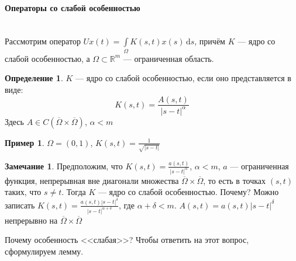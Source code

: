 \documentclass[11pt,openany,a4paper]{scrartcl}
\theoremstyle{plain}
\theoremstyle{definition}
\newtheorem{definition}[theorem]{Определение}
\newtheorem{remark}[theorem]{Замечание}
\newtheorem{example}[theorem]{Пример}
\newcommand\mb{\mathbb}
\newcommand\real{\mb R}
\newcommand\lparagraph[1]{\paragraph{#1}\mbox{}\\}
\newcommand{\dif}{\, \mathrm d}
\begin{document}
\lparagraph{Операторы со слабой особенностью}

Рассмотрим оператор $Ux(t) = \int\limits_\Omega K(s, t) x(s) \dif s$, причём $K$ —
ядро со слабой особенностью, а $\Omega \subset \real^m$ — ограниченная область.

\begin{definition}
    $K$ — ядро со слабой особенностью, если оно представляется в виде:
    $$
    K(s, t) = \frac{A(s, t)}{|s - t|^\alpha}
    $$
    Здесь $A \in C(\overline\Omega \times \overline\Omega)$, $\alpha < m$
\end{definition}
\begin{example}
    $\Omega = (0, 1)$, $K(s, t) = \frac{1}{\sqrt{|s - t|}}$
\end{example}
\begin{remark}
    Предположим, что $K(s, t) = \frac{a(s, t)}{|s - t|^\alpha}$, $\alpha < m$,
    $a$ — ограниченная функция, непрерывная вне диагонали множества
    $\overline\Omega \times \overline\Omega$, то есть в точках $(s, t)$ таких,
    что $s \neq t$. Тогда $K$ — ядро со слабой особенностью. Почему? Можно
    записать $K(s, t) = \frac{a(s, t)|s-t|^\delta}{|s-t|^{\alpha + \delta}}$, где
    $\alpha + \delta < m$. $A(s, t) = a(s, t)|s-t|^\delta$ непрерывно на
    $\overline\Omega \times \overline\Omega$
\end{remark}

Почему особенность <<слабая>>? Чтобы ответить на этот вопрос, сформулируем лемму.
\end{document}
